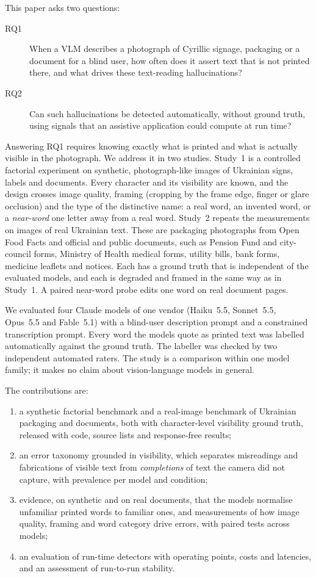 This paper asks two questions:
\begin{description}
\item[RQ1] When a VLM describes a photograph of Cyrillic signage, packaging or a document for a blind user, how often does it assert text that is not printed there, and what drives these text-reading hallucinations?
\item[RQ2] Can such hallucinations be detected automatically, without ground truth, using signals that an assistive application could compute at run time?
\end{description}

Answering RQ1 requires knowing exactly what is printed and what is actually visible in the photograph. We address it in two studies. Study~1 is a controlled factorial experiment on \NImages{} synthetic, photograph-like images of Ukrainian signs, labels and documents. Every character and its visibility are known, and the design crosses image quality, framing (cropping by the frame edge, finger or glare occlusion) and the type of the distinctive name: a real word, an invented word, or a \emph{near-word} one letter away from a real word. Study~2 repeats the measurements on \RealNImages{} images of real Ukrainian text. These are \NPack{} packaging photographs from Open Food Facts and \NDoc{} official and public documents, such as Pension Fund and city-council forms, Ministry of Health medical forms, utility bills, bank forms, medicine leaflets and notices. Each has a ground truth that is independent of the evaluated models, and each is degraded and framed in the same way as in Study~1. A paired near-word probe edits one word on real document pages.

We evaluated four Claude models of one vendor (Haiku~5.5, Sonnet~5.5, Opus~5.5 and Fable~5.1) with a blind-user description prompt and a constrained transcription prompt. Every word the models quote as printed text was labelled automatically against the ground truth. The labeller was checked by two independent automated raters. The study is a comparison within one model family; it makes no claim about vision-language models in general.

The contributions are:
\begin{enumerate}
\item a synthetic factorial benchmark and a real-image benchmark of Ukrainian packaging and documents, both with character-level visibility ground truth, released with code, source lists and response-free results;
\item an error taxonomy grounded in visibility, which separates misreadings and fabrications of visible text from \emph{completions} of text the camera did not capture, with prevalence per model and condition;
\item evidence, on synthetic and on real documents, that the models normalise unfamiliar printed words to familiar ones, and measurements of how image quality, framing and word category drive errors, with paired tests across models;
\item an evaluation of run-time detectors with operating points, costs and latencies, and an assessment of run-to-run stability.
\end{enumerate}

